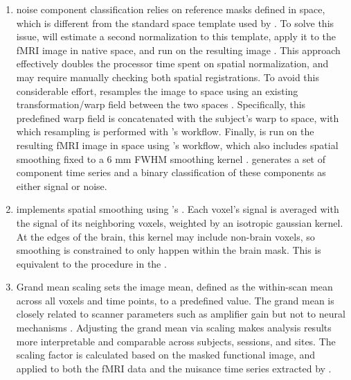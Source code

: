 \begin{enumerate}[leftmargin=*]

\item

 noise component classification
\citep{10.1016/j.neuroimage.2015.02.064} relies on reference masks defined
in  space, which is different from the standard space
template used by . To solve this issue,  will
estimate a second normalization to this template, apply it to the fMRI
image in native space, and run  on the resulting image
\citep{10.1101/2021.02.10.430678}. This approach effectively doubles the
processor time spent on spatial normalization, and may require manually
checking both spatial registrations. To avoid this considerable effort,
 resamples the image to  space using
an existing transformation/warp field between the two spaces
\citep{horn_transform}. Specifically, this predefined warp field is
concatenated with the subject's warp to  space,
with which resampling is performed with 's
 workflow. Finally,  is run on the
resulting fMRI image in  space using
's  workflow, which also includes spatial
smoothing fixed to a 6 mm FWHM smoothing kernel
\citep{10.1016/j.neuroimage.2015.02.064}.  generates a set
of component time series and a binary classification of these components as
either signal or noise.

\item

 implements spatial smoothing using 's
 \citep{10.1006/cbmr.1996.0014}. Each voxel's signal is
averaged with the signal of its neighboring voxels, weighted by an
isotropic gaussian kernel. At the edges of the brain, this kernel may
include non-brain voxels, so smoothing is constrained to only happen within
the brain mask. This is equivalent to the procedure in the 
\citep{10.1016/j.neuroimage.2013.04.127}.

\item\label{itm:grandmean}

Grand mean scaling sets the image mean, defined as the within-scan mean
across all voxels and time points, to a predefined value. The grand mean is
closely related to scanner parameters such as amplifier gain but not to
neural mechanisms \citep{10.1006/nimg.2002.1226}. Adjusting the grand mean
via scaling makes analysis results more interpretable and comparable across
subjects, sessions, and sites. The scaling factor is calculated based on
the masked functional image, and applied to both the fMRI data and the
nuisance time series extracted by .


\end{enumerate}
